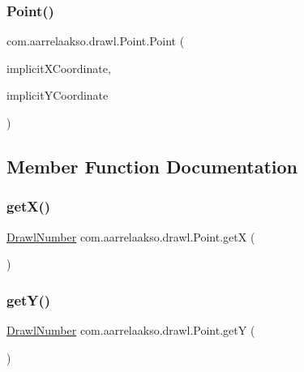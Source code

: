 \subsubsection{\texorpdfstring{Point()}{Point()}\hspace{0.1cm}{\footnotesize\ttfamily [2/2]}}
{\footnotesize\ttfamily com.\+aarrelaakso.\+drawl.\+Point.\+Point (\begin{DoxyParamCaption}\item[{@Not\+Null Integer}]{implicit\+X\+Coordinate,  }\item[{@Not\+Null Integer}]{implicit\+Y\+Coordinate }\end{DoxyParamCaption})\hspace{0.3cm}{\ttfamily [protected]}}



\subsection{Member Function Documentation}
\mbox{\label{classcom_1_1aarrelaakso_1_1drawl_1_1_point_a69062d6a80ab951e2687e31d2b3f99ee}} 
\subsubsection{\texorpdfstring{get\+X()}{getX()}}
{\footnotesize\ttfamily \hyperlink{classcom_1_1aarrelaakso_1_1drawl_1_1_drawl_number}{Drawl\+Number} com.\+aarrelaakso.\+drawl.\+Point.\+getX (\begin{DoxyParamCaption}{ }\end{DoxyParamCaption})\hspace{0.3cm}{\ttfamily [protected]}}

\mbox{\label{classcom_1_1aarrelaakso_1_1drawl_1_1_point_a9b4a6a3de7c80227d5d318dc9afb4edd}} 
\subsubsection{\texorpdfstring{get\+Y()}{getY()}}
{\footnotesize\ttfamily \hyperlink{classcom_1_1aarrelaakso_1_1drawl_1_1_drawl_number}{Drawl\+Number} com.\+aarrelaakso.\+drawl.\+Point.\+getY (\begin{DoxyParamCaption}{ }\end{DoxyParamCaption})\hspace{0.3cm}{\ttfamily [protected]}}



